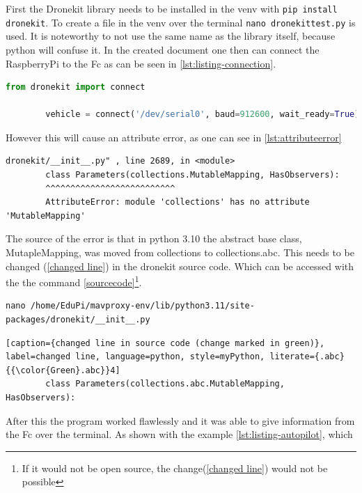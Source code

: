 \documentclass[svgnames]{article}
\begin{document}
	First the Dronekit library needs to be installed in the \gls{venv} with \lstinline|pip install dronekit|. To create a file in the \gls{venv} over the terminal \lstinline|nano dronekittest.py| is used. It is noteworthy to not use the same name as the library itself, because python will confuse it. In the created document one then can connect the RaspberryPi to the \gls{Fc} as can be seen in \cref{lst:listing-connection}.
	\begin{lstlisting}[language=Python, style=myPython, caption=Python DroneKit Example, label=lst:listing-connection]
		from dronekit import connect

		vehicle = connect('/dev/serial0', baud=912600, wait_ready=True)
	\end{lstlisting}
	
	However this will cause an attribute error, as one can see in \cref{lst:attributeerror} 
	\begin{lstlisting}[label=lst:attributeerror, caption={AttributeError after connecting}]
		dronekit/__init__.py" , line 2689, in <module>
		class Parameters(collections.MutableMapping, HasObservers):
		^^^^^^^^^^^^^^^^^^^^^^^^^^
		AttributeError: module 'collections' has no attribute 'MutableMapping'
\end{lstlisting}
	The source of the error is that in python 3.10 the abstract base class, MutapleMapping, was moved from collections to collections.abc. This needs to be changed (\cref{changed line}) in the dronekit source code. Which can be accessed with the the command \cref{sourcecode}\footnote{If it would not be open source, the change(\cref{changed line}) would not be possible}.
	
	\begin{lstlisting}[caption= accessing source code, label=sourcecode]
nano /home/EduPi/mavproxy-env/lib/python3.11/site-packages/dronekit/__init__.py
\end{lstlisting}

	\begin{lstlisting}[caption={changed line in source code (change marked in green)}, label=changed line, language=python, style=myPython, literate={.abc}{{\color{Green}.abc}}4]
		class Parameters(collections.abc.MutableMapping, HasObservers):
	\end{lstlisting}
	
	After this the program worked flawlessly and it was able to give information from the \gls{Fc} over the terminal. As shown with the example \cref{lst:listing-autopilot}, which 
	
\end{document}

